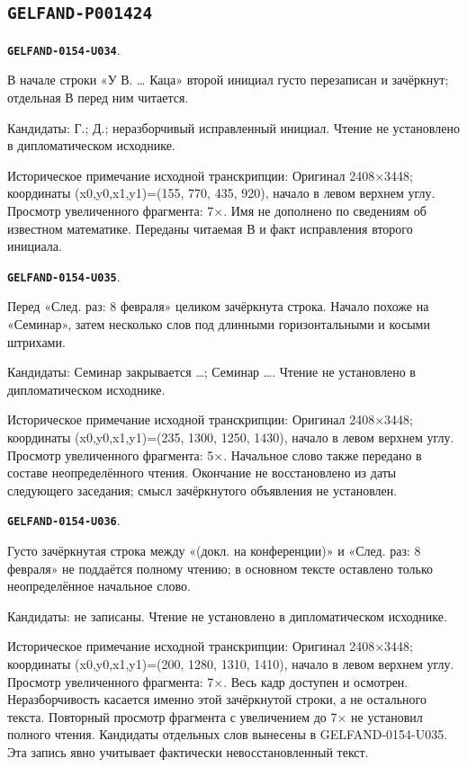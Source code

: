\documentclass[11pt]{article}
\theoremstyle{definition}
\theoremstyle{remark}
\begin{document}
\subsection*{\texttt{GELFAND-P001424}}
\par\noindent\leavevmode{}\label{GELFAND-0154-U034}\label{GELFAND-P001424:kac-initial:note}\textbf{\texttt{GELFAND-0154-U034}}.\nopagebreak[4]\par
В начале строки «У В. … Каца» второй инициал густо перезаписан и зачёркнут; отдельная В перед ним читается.\par
Кандидаты: Г.; Д.; неразборчивый исправленный инициал. Чтение не установлено в дипломатическом исходнике.\par
Историческое примечание исходной транскрипции: Оригинал 2408×3448; координаты (x0,y0,x1,y1)=(155, 770, 435, 920), начало в левом верхнем углу. Просмотр увеличенного фрагмента: 7×. Имя не дополнено по сведениям об известном математике. Переданы читаемая В и факт исправления второго инициала.\par\medskip
\par\noindent\leavevmode{}\label{GELFAND-0154-U035}\label{GELFAND-P001424:cancelled-seminar-line:note}\textbf{\texttt{GELFAND-0154-U035}}.\nopagebreak[4]\par
Перед «След. раз: 8 февраля» целиком зачёркнута строка. Начало похоже на «Семинар», затем несколько слов под длинными горизонтальными и косыми штрихами.\par
Кандидаты: Семинар закрывается …; Семинар …. Чтение не установлено в дипломатическом исходнике.\par
Историческое примечание исходной транскрипции: Оригинал 2408×3448; координаты (x0,y0,x1,y1)=(235, 1300, 1250, 1430), начало в левом верхнем углу. Просмотр увеличенного фрагмента: 5×. Начальное слово также передано в составе неопределённого чтения. Окончание не восстановлено из даты следующего заседания; смысл зачёркнутого объявления не установлен.\par\medskip
\par\noindent\leavevmode{}\label{GELFAND-0154-U036}\label{GELFAND-P001424:cancelled-seminar-content:note}\textbf{\texttt{GELFAND-0154-U036}}.\nopagebreak[4]\par
Густо зачёркнутая строка между «(докл. на конференции)» и «След. раз: 8 февраля» не поддаётся полному чтению; в основном тексте оставлено только неопределённое начальное слово.\par
Кандидаты: не записаны. Чтение не установлено в дипломатическом исходнике.\par
Историческое примечание исходной транскрипции: Оригинал 2408×3448; координаты (x0,y0,x1,y1)=(200, 1280, 1310, 1410), начало в левом верхнем углу. Просмотр увеличенного фрагмента: 7×. Весь кадр доступен и осмотрен. Неразборчивость касается именно этой зачёркнутой строки, а не остального текста. Повторный просмотр фрагмента с увеличением до 7× не установил полного чтения. Кандидаты отдельных слов вынесены в GELFAND-0154-U035. Эта запись явно учитывает фактически невосстановленный текст.\par\medskip
\end{document}
